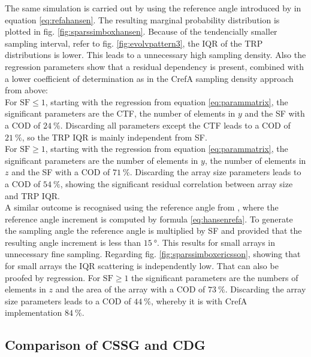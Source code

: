 The same simulation is carried out by using the reference angle introduced by \cite{hansen} in equation \ref{eq:refahansen}. The resulting marginal probability distribution is plotted in fig. \ref{fig:sparssimboxhansen}. Because of the tendencially smaller sampling interval, refer to fig. \ref{fig:evolvpattern3}, the \ac{IQR} of the \ac{TRP} distributions is lower. This leads to a unnecessary high sampling density. Also the regression parameters show that a residual dependency is present, combined with a lower coefficient of determination as in the \ac{CrefA} sampling density approach from above:\\
For $\text{SF}\le 1$, starting with the regression from equation \ref{eq:parammatrix}, the significant parameters are the \ac{CTF}, the number of elements in $y$ and the \ac{SF} with a \ac{COD} of $\SI{24}{\percent}$. Discarding all parameters except the \ac{CTF} leads to a \ac{COD} of $\SI{21}{\percent}$, so the \ac{TRP} \ac{IQR} is mainly independent from \ac{SF}.\\
For $\text{SF}\ge 1$, starting with the regression from equation \ref{eq:parammatrix}, the significant parameters are the number of elements in $y$, the number of elements in $z$ and the \ac{SF} with a \ac{COD} of $\SI{71}{\percent}$. Discarding the array size parameters leads to a \ac{COD} of $\SI{54}{\percent}$, showing the significant residual correlation between array size and \ac{TRP} \ac{IQR}.\\
A similar outcome is recognised using the reference angle from \cite{2018arXiv180310993F}, where the reference angle increment is computed by formula \ref{eq:hansenrefa}. To generate the sampling angle the reference angle is multiplied by \ac{SF} and provided that the resulting angle increment is less than $\SI{15}{\degree}$. This results for small arrays in unnecessary fine sampling. Regarding fig. \ref{fig:sparssimboxericsson}, showing that for small arrays the \ac{IQR} scattering is independently low. That can also be proofed by regression. For $\text{SF}\ge 1$ the significant parameters are the numbers of elements in $z$ and the area of the array with a \ac{COD} of $\SI{73}{\percent}$. Discarding the array size parameters leads to a \ac{COD} of $\SI{44}{\percent}$, whereby it is with \ac{CrefA} implementation $\SI{84}{\percent}$.

\subsection{Comparison of CSSG and CDG}

